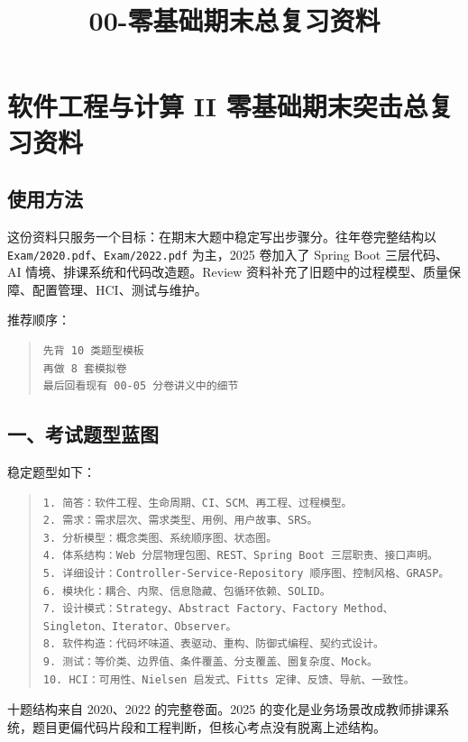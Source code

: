 \documentclass[UTF8,zihao=-4]{ctexart}
\title{00-零基础期末总复习资料}
\author{}
\date{}
\begin{document}
\maketitle
\setcounter{tocdepth}{1}
\tableofcontents
\newpage
\section{软件工程与计算 II 零基础期末突击总复习资料}


\subsection{使用方法}


这份资料只服务一个目标：在期末大题中稳定写出步骤分。往年卷完整结构以 \texttt{Exam/2020.pdf}、\texttt{Exam/2022.pdf} 为主，2025 卷加入了 Spring Boot 三层代码、AI 情境、排课系统和代码改造题。Review 资料补充了旧题中的过程模型、质量保障、配置管理、HCI、测试与维护。


推荐顺序：


\begin{quote}
\footnotesize
\begin{verbatim}
先背 10 类题型模板
再做 8 套模拟卷
最后回看现有 00-05 分卷讲义中的细节
\end{verbatim}
\end{quote}


\subsection{一、考试题型蓝图}


稳定题型如下：


\begin{quote}
\footnotesize
\begin{verbatim}
1. 简答：软件工程、生命周期、CI、SCM、再工程、过程模型。
2. 需求：需求层次、需求类型、用例、用户故事、SRS。
3. 分析模型：概念类图、系统顺序图、状态图。
4. 体系结构：Web 分层物理包图、REST、Spring Boot 三层职责、接口声明。
5. 详细设计：Controller-Service-Repository 顺序图、控制风格、GRASP。
6. 模块化：耦合、内聚、信息隐藏、包循环依赖、SOLID。
7. 设计模式：Strategy、Abstract Factory、Factory Method、Singleton、Iterator、Observer。
8. 软件构造：代码坏味道、表驱动、重构、防御式编程、契约式设计。
9. 测试：等价类、边界值、条件覆盖、分支覆盖、圈复杂度、Mock。
10. HCI：可用性、Nielsen 启发式、Fitts 定律、反馈、导航、一致性。
\end{verbatim}
\end{quote}


十题结构来自 2020、2022 的完整卷面。2025 的变化是业务场景改成教师排课系统，题目更偏代码片段和工程判断，但核心考点没有脱离上述结构。
\end{document}
